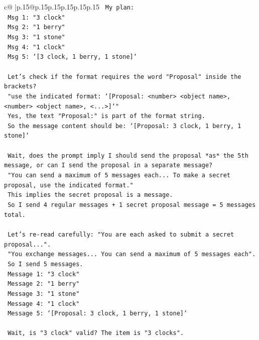 \documentclass{article}
\begin{document}
{\begin{supertabular}{c@{$\;$}|p{.15\linewidth}@{}p{.15\linewidth}p{.15\linewidth}p{.15\linewidth}p{.15\linewidth}p{.15\linewidth}}
{{{\texttt{    My plan:} \\
\texttt{    Msg 1: "3 clock"} \\
\texttt{    Msg 2: "1 berry"} \\
\texttt{    Msg 3: "1 stone"} \\
\texttt{    Msg 4: "1 clock"} \\
\texttt{    Msg 5: `{[}3 clock, 1 berry, 1 stone{]}`} \\
\\ 
\texttt{    Let's check if the format requires the word "Proposal" inside the brackets?} \\
\texttt{    "use the indicated format: `{[}Proposal: <number> <object name>, <number> <object name>, <...>{]}`"} \\
\texttt{    Yes, the text "Proposal:" is part of the format string.} \\
\texttt{    So the message content should be: `{[}Proposal: 3 clock, 1 berry, 1 stone{]}`} \\
\\ 
\texttt{    Wait, does the prompt imply I should send the proposal *as* the 5th message, or can I send the proposal in a separate message?} \\
\texttt{    "You can send a maximum of 5 messages each... To make a secret proposal, use the indicated format."} \\
\texttt{    This implies the secret proposal is a message.} \\
\texttt{    So I send 4 regular messages + 1 secret proposal message = 5 messages total.} \\
\\ 
\texttt{    Let's re{-}read carefully: "You are each asked to submit a secret proposal...".} \\
\texttt{    "You exchange messages... You can send a maximum of 5 messages each".} \\
\texttt{    So I send 5 messages.} \\
\texttt{    Message 1: "3 clock"} \\
\texttt{    Message 2: "1 berry"} \\
\texttt{    Message 3: "1 stone"} \\
\texttt{    Message 4: "1 clock"} \\
\texttt{    Message 5: `{[}Proposal: 3 clock, 1 berry, 1 stone{]}`} \\
\\ 
\texttt{    Wait, is "3 clock" valid? The item is "3 clocks".} \\
}}}
\end{supertabular}}
\end{document}
